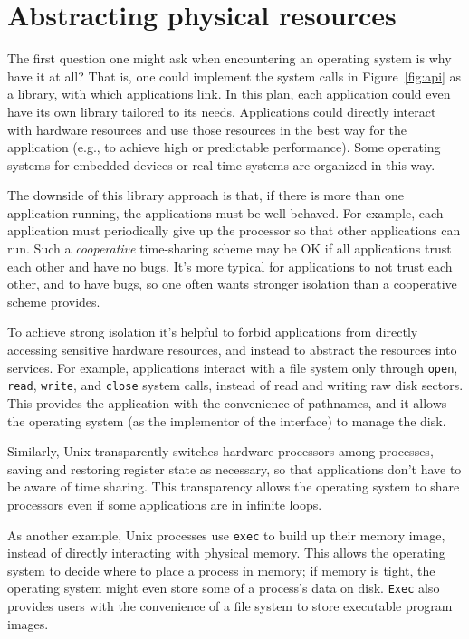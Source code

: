 \section{Abstracting physical resources}

The first question one might ask when encountering an operating system is why
have it at all?  That is, one could implement the system calls in
Figure~\ref{fig:api}
as a library, with which applications link.  In this plan,
each application could even have its own library tailored to its needs.
Applications could directly interact with hardware resources
and use those resources in the best way for the application (e.g., to achieve
high or predictable performance).  Some operating systems for
embedded devices or real-time systems are organized in this way.

The downside of this library approach is that, if there is more than one
application running, the applications must be well-behaved.
For example, each application must periodically give up the
processor so that other applications can run.
Such a 
\textit{cooperative} 
time-sharing scheme may be OK if all applications trust each
other and have no bugs. It's more typical for applications
to not trust each other, and to have bugs, so one often wants
stronger isolation than a cooperative scheme provides.

To achieve strong isolation it's helpful to forbid applications from
directly accessing sensitive hardware resources, and instead to abstract the
resources into services.  For example, applications interact with a file system
only through
\lstinline{open},
\lstinline{read},
\lstinline{write}, 
and
\lstinline{close}
system calls,
instead of read and writing raw disk sectors. 
This provides the application with the convenience of pathnames, and it allows
the operating system (as the implementor of the interface) to manage the disk. 

Similarly, Unix transparently switches hardware processors among processes,
saving and restoring register state as necessary,
so that applications don't have to be
aware of time sharing.  This transparency allows the operating system to share
processors even if some applications are in infinite loops.

As another example, Unix processes use 
\lstinline{exec}
to build up their memory image, instead of directly interacting with physical
memory.  This allows the operating system to decide where to place a process in
memory; if memory is tight, the operating system might even store some of
a process's data on disk.
\lstinline{Exec}
also provides
users with the convenience of a file system to store executable program images.  

